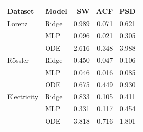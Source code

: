 \begin{tabular}{llrrr}
\toprule
Dataset & Model & SW & ACF & PSD \\
\midrule
Lorenz & Ridge & 0.989 & 0.071 & 0.621 \\
 & MLP & 0.096 & 0.021 & 0.305 \\
 & ODE & 2.616 & 0.348 & 3.988 \\
R\"ossler & Ridge & 0.450 & 0.047 & 0.106 \\
 & MLP & 0.046 & 0.016 & 0.085 \\
 & ODE & 0.675 & 0.449 & 0.930 \\
Electricity & Ridge & 0.833 & 0.105 & 0.411 \\
 & MLP & 0.331 & 0.117 & 0.454 \\
 & ODE & 3.818 & 0.716 & 1.801 \\
\bottomrule
\end{tabular}
